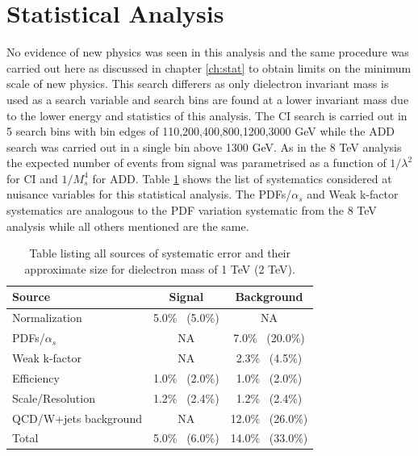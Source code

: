 \section{Statistical Analysis}

	No evidence of new physics was seen in this analysis and the same procedure was carried out here as discussed in chapter \ref{ch:stat} to obtain limits on the minimum scale of new physics. This search differers as only dielectron invariant mass is used as a search variable and search bins are found at a lower invariant mass due to the lower energy and statistics of this analysis. The CI search is carried out in 5 search bins with bin edges of {110,200,400,800,1200,3000} GeV while the ADD search was carried out in a single bin above 1300 GeV. As in the 8 TeV analysis the expected number of events from signal was parametrised as a function of $1/\lambda^{2}$ for CI and $1/M_{s}^{4}$ for ADD. Table \ref{tab:sys7} shows the list of systematics considered at nuisance variables for this statistical analysis. The PDFs/$\alpha_{s}$ and Weak k-factor systematics are analogous to the PDF variation systematic from the 8 TeV analysis while all others mentioned are the same. 


	\begin {table}[h]
        \begin{center}
        \begin{tabular}{ | l | c c | } 
            \hline
            Source 					& Signal            & Background         		\\
            \hline
            Normalization       	& 5.0\% ~(5.0\%)      	& NA        			\\
			PDFs/$\alpha_{s}$		& NA 			      	& 7.0\% ~(20.0\%)      	\\
			Weak k-factor       	& NA 			      	& 2.3\% ~(4.5\%)       	\\
			Efficiency  	     	& 1.0\% ~(2.0\%)      	& 1.0\% ~(2.0\%)       	\\
			Scale/Resolution       	& 1.2\% ~(2.4\%)      	& 1.2\% ~(2.4\%)       	\\
			QCD/W+jets background  	& NA 			      	& 12.0\% ~(26.0\%)      \\
            \hline  
            Total               	& 5.0\% ~(6.0\%)      	& 14.0\% ~(33.0\%)      \\
            \hline
        \end{tabular}
        \caption{Table listing all sources of systematic error and their approximate size for dielectron mass of 1 TeV (2 TeV).}
        \label{tab:sys7}
        \end{center}
    \end {table}



